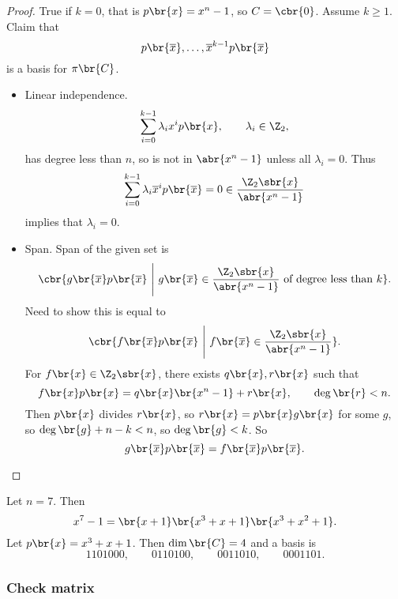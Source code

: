 \begin{proof}
True if $ k = 0 $, that is $ p\br{x} = x^n - 1 $, so $ C = \cbr{0} $. Assume $ k \ge 1 $. Claim that
$$ p\br{\overline{x}}, \dots, \overline{x}^{k - 1}p\br{\overline{x}} $$
is a basis for $ \pi\br{C} $.
\begin{itemize}
\item Linear independence.
$$ \sum_{i = 0}^{k - 1} \lambda_ix^ip\br{x}, \qquad \lambda_i \in \Z_2, $$
has degree less than $ n $, so is not in $ \abr{x^n - 1} $ unless all $ \lambda_i = 0 $. Thus
$$ \sum_{i = 0}^{k - 1} \lambda_i\overline{x}^ip\br{\overline{x}} = 0 \in \dfrac{\Z_2\sbr{x}}{\abr{x^n - 1}} $$
implies that $ \lambda_i = 0 $.

\pagebreak

\item Span. Span of the given set is
$$ \cbr{g\br{\overline{x}}p\br{\overline{x}} \ \Bigg| \ g\br{\overline{x}} \in \dfrac{\Z_2\sbr{x}}{\abr{x^n - 1}} \ \text{of degree less than} \ k}. $$
Need to show this is equal to
$$ \cbr{f\br{\overline{x}}p\br{\overline{x}} \ \Bigg| \ f\br{\overline{x}} \in \dfrac{\Z_2\sbr{x}}{\abr{x^n - 1}}}. $$
For $ f\br{x} \in \Z_2\sbr{x} $, there exists $ q\br{x}, r\br{x} $ such that
$$ f\br{x}p\br{x} = q\br{x}\br{x^n - 1} + r\br{x}, \qquad \deg\br{r} < n. $$
Then $ p\br{x} $ divides $ r\br{x} $, so $ r\br{x} = p\br{x}g\br{x} $ for some $ g $, so $ \deg\br{g} + n - k < n $, so $ \deg\br{g} < k $. So
$$ g\br{\overline{x}}p\br{\overline{x}} = f\br{\overline{x}}p\br{\overline{x}}. $$
\end{itemize}
\end{proof}

\begin{example*}
Let $ n = 7 $. Then
$$ x^7 - 1 = \br{x + 1}\br{x^3 + x + 1}\br{x^3 + x^2 + 1}. $$
Let $ p\br{x} = x^3 + x + 1 $. Then $ \dim\br{C} = 4 $ and a basis is
$$ 1101000, \qquad 0110100, \qquad 0011010, \qquad 0001101. $$
\end{example*}

\subsubsection{Check matrix}

